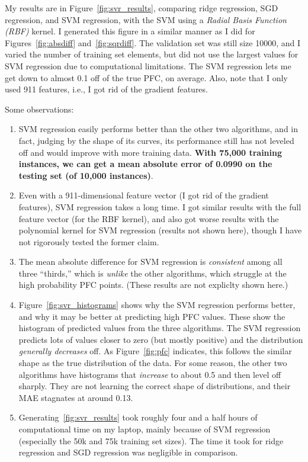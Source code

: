 \documentclass[a4paper, 11pt]{article}
\begin{document}
My results are in Figure~\ref{fig:svr_results}, comparing ridge regression, SGD regression, and SVM
regression, with the SVM using a \emph{Radial Basis Function (RBF)} kernel. I generated this figure
in a similar manner as I did for Figures~\ref{fig:absdiff} and~\ref{fig:sqrdiff}. The validation set
was still size 10000, and I varied the number of training set elements, but did not use the largest
values for SVM regression due to computational limitations. The SVM regression lets me get down to
almost 0.1 off of the true PFC, on average. Also, note that I only used 911 features, i.e., I got
rid of the gradient features.

Some observations:

\begin{enumerate}
    \item SVM regression easily performs better than the other two algorithms, and in fact, judging
    by the shape of its curves, its performance still has not leveled off and would improve with
    more training data. \textbf{With 75,000 training instances, we can get a mean absolute error of
    0.0990 on the testing set (of 10,000 instances)}.

    \item Even with a 911-dimensional feature vector (I got rid of the gradient features), SVM
    regression takes a long time. I got similar results with the full feature vector (for the RBF
    kernel), and also got worse results with the polynomial kernel for SVM regression (results not
    shown here), though I have not rigorously tested the former claim.

    \item The mean absolute difference for SVM regression is \emph{consistent} among all three
    ``thirds,'' which is \emph{unlike} the other algorithms, which struggle at the high probability
    PFC points. (These results are not expliclty shown here.)

    \item Figure~\ref{fig:svr_histograms} shows why the SVM regression performs better, and why it
    may be better at predicting high PFC values. These show the histogram of predicted values from
    the three algorithms. The SVM regression predicts lots of values closer to zero (but mostly
    positive) and the distribution \emph{generally decreases} off. As Figure~\ref{fig:pfc}
    indicates, this follows the similar shape as the true distribution of the data. For some reason,
    the other two algorithms have histograms that \emph{increase} to about 0.5 and then level off
    sharply. They are not learning the correct shape of distributions, and their MAE stagnates at
    around 0.13.

    \item Generating~\ref{fig:svr_results} took roughly four and a half hours of computational time
    on my laptop, mainly because of SVM regression (especially the 50k and 75k training set sizes).
    The time it took for ridge regression and SGD regression was negligible in comparison.
\end{enumerate}
\end{document}
